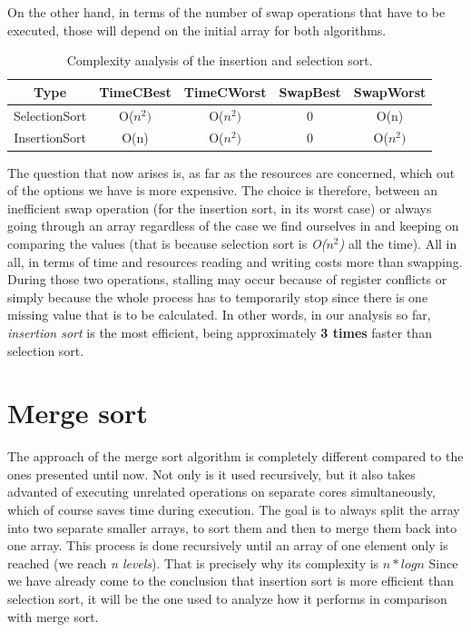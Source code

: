 \documentclass[a4paper,11pt]{article}
\begin{document}
On the other hand, in terms of the number of swap operations that have to be executed, those will depend on the initial array for both algorithms.\newline   

\begin{table}[h!]
    \centering
    \begin{tabular}{||c c c c c||} 
    \hline
    Type & TimeCBest & TimeCWorst & SwapBest & SwapWorst\\ [0.5ex]
    \hline
    SelectionSort& O($n^2)$ & O($n^2)$ & 0 & O(n)\\
    InsertionSort & O(n) & O($n^2)$ &  0 & O($n^2)$ \\ [1ex] 
    \hline
    \end{tabular}
    \caption{Complexity analysis of the insertion and selection sort.} 
    \label{table:1}
\end{table}

The question that now arises is, as far as the resources are concerned, which out of the options we have is more expensive. The choice is therefore,
between an inefficient swap operation (for the insertion sort, in its worst case) 
or  always going through an array regardless of the case we find ourselves in and keeping on comparing the values 
(that is because selection sort is \textit{O($n^2$)} all the time).
All in all, in terms of time and resources reading and writing costs more than swapping. During those two operations, stalling may occur because of 
register conflicts or simply because the whole process has to temporarily stop since there is one missing value that is to be calculated.\newline\newline
In other words, in our analysis so far, \textit{insertion sort} is the most efficient, being approximately \textbf{3 times} faster than selection sort.

\section*{Merge sort}

The approach of the merge sort algorithm is completely different compared to the ones presented until now. Not only is it used recursively,
but it also takes advanted of executing unrelated operations on separate cores simultaneously, which of course saves time during execution.
The goal is to always split the array into two separate smaller arrays, to sort them and then to merge them back into one array. This process is done
recursively until an array of one element only is reached (we reach \textit{n levels}). That is precisely why its complexity is \textit{$n*logn$}\newline
Since we have already come to the conclusion that insertion sort is more efficient than selection sort, 
it will be the one used to analyze how it performs in comparison with merge sort.\newline
\end{document}
